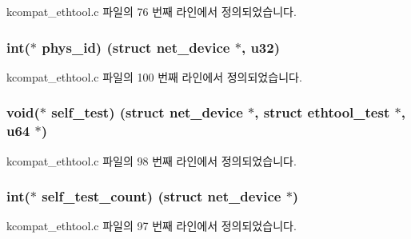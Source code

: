 kcompat\+\_\+ethtool.\+c 파일의 76 번째 라인에서 정의되었습니다.

\subsubsection[{\texorpdfstring{phys\+\_\+id}{phys_id}}]{\setlength{\rightskip}{0pt plus 5cm}int($\ast$ phys\+\_\+id) (struct net\+\_\+device $\ast$, {\bf u32})}\hypertarget{struct__kc__ethtool__ops_a833c39d85227b854c0eec6815d09138f}{}\label{struct__kc__ethtool__ops_a833c39d85227b854c0eec6815d09138f}


kcompat\+\_\+ethtool.\+c 파일의 100 번째 라인에서 정의되었습니다.

\subsubsection[{\texorpdfstring{self\+\_\+test}{self_test}}]{\setlength{\rightskip}{0pt plus 5cm}void($\ast$ self\+\_\+test) (struct net\+\_\+device $\ast$, struct {\bf ethtool\+\_\+test} $\ast$, {\bf u64} $\ast$)}\hypertarget{struct__kc__ethtool__ops_aaa2de6dc773a12b69d68de05af4d6443}{}\label{struct__kc__ethtool__ops_aaa2de6dc773a12b69d68de05af4d6443}


kcompat\+\_\+ethtool.\+c 파일의 98 번째 라인에서 정의되었습니다.

\subsubsection[{\texorpdfstring{self\+\_\+test\+\_\+count}{self_test_count}}]{\setlength{\rightskip}{0pt plus 5cm}int($\ast$ self\+\_\+test\+\_\+count) (struct net\+\_\+device $\ast$)}\hypertarget{struct__kc__ethtool__ops_ade1b8c5a494838143165b79165636358}{}\label{struct__kc__ethtool__ops_ade1b8c5a494838143165b79165636358}


kcompat\+\_\+ethtool.\+c 파일의 97 번째 라인에서 정의되었습니다.

